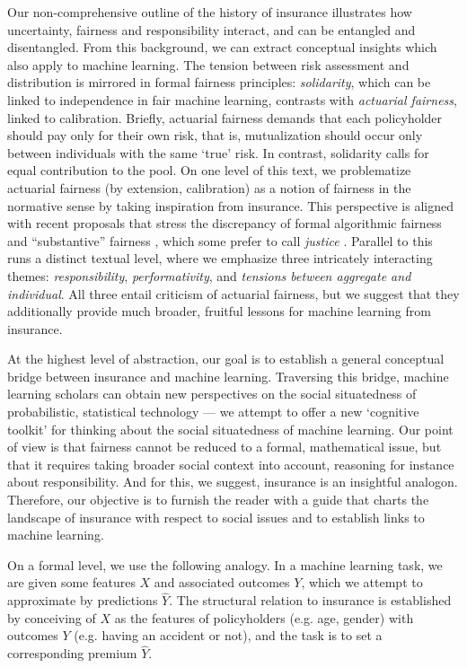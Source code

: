 \documentclass[11pt]{article} %
\makeatletter
\newcommand*{\eg}{e.g.\@\xspace}
\makeatother
\begin{document}
Our non-comprehensive outline of the history of insurance illustrates how uncertainty, fairness and responsibility interact, and can be entangled and disentangled. From this background, we can extract conceptual insights which also apply to machine learning.
The tension between risk assessment and distribution is mirrored in formal fairness principles: \textit{solidarity}, which can be linked to independence in fair machine learning, contrasts with \textit{actuarial fairness}, linked to calibration. Briefly, actuarial fairness demands that each policyholder should pay only for their own risk, that is, mutualization should occur only between individuals with the same `true' risk. In contrast, solidarity calls for equal contribution to the pool.
On one level of this text, we problematize actuarial fairness (by extension, calibration) as a notion of fairness in the normative sense by taking inspiration from insurance. This perspective is aligned with recent proposals that stress the discrepancy of formal algorithmic fairness and ``substantive'' fairness \citep{green2022escaping}, which some prefer to call \textit{justice} \citep{vredenburghfairness}.
Parallel to this runs a distinct textual level, where we emphasize three intricately interacting themes: \textit{responsibility}, \textit{performativity}, and \textit{tensions between aggregate and individual}. All three entail criticism of actuarial fairness, but we suggest that they additionally provide much broader, fruitful lessons for machine learning from insurance.

At the highest level of abstraction, our goal is to establish a general conceptual bridge between insurance and machine learning. Traversing this bridge, machine learning scholars can obtain new perspectives on the social situatedness of probabilistic, statistical technology --- we attempt to offer a new `cognitive toolkit' for thinking about the social situatedness of machine learning. Our point of view is that fairness cannot be reduced to a formal, mathematical issue, but that it requires taking broader social context into account, reasoning for instance about responsibility. And for this, we suggest, insurance is an insightful analogon.  Therefore, our objective is to furnish the reader with a guide that charts the landscape of insurance with respect to social issues and to establish links to machine learning.

On a formal level, we use the following analogy. In a machine learning task, we are given some features $X$ and associated outcomes $Y$, which we attempt to approximate by predictions $\hat{Y}$. The structural relation to insurance is established by conceiving of $X$ as the features of policyholders (\eg age, gender) with outcomes $Y$ (\eg having an accident or not), and the task is to set a corresponding premium $\hat{Y}$.
\end{document}
